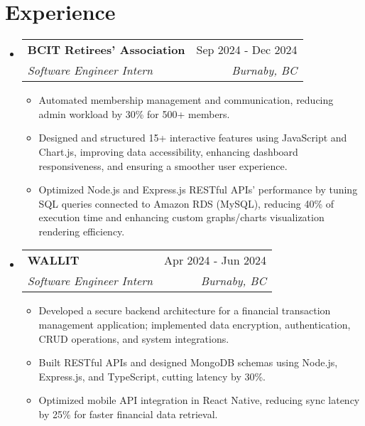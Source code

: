 \documentclass[letterpaper,11pt]{article}
\makeatletter
\newcommand{\resumeItem}[1]{
\item\small{
{#1 \vspace{-2pt}}
}
}
\newcommand{\resumeSubheading}[4]{
\vspace{-2pt}\item
\begin{tabular*}{0.97\textwidth}[t]{l@{\extracolsep{\fill}}r}
\textbf{#1} & #2 \\
\textit{\small#3} & \textit{\small #4} \\
\end{tabular*}\vspace{-7pt}
}
\newcommand{\resumeSubHeadingListStart}{\begin{itemize}[leftmargin=0.15in, label={}]}
\newcommand{\resumeSubHeadingListEnd}{\end{itemize}}
\newcommand{\resumeItemListStart}{\begin{itemize}}
\newcommand{\resumeItemListEnd}{\end{itemize}\vspace{-5pt}}
\makeatother
\begin{document}
\section{Experience}
\resumeSubHeadingListStart
\resumeSubheading{BCIT Retirees' Association}{Sep 2024 - Dec 2024}{Software Engineer Intern}{Burnaby, BC}
\resumeItemListStart
\resumeItem{Automated membership management and communication, reducing admin workload by 30\% for 500+ members.}
\resumeItem{Designed and structured 15+ interactive features using JavaScript and Chart.js, improving data accessibility, enhancing dashboard responsiveness, and ensuring a smoother user experience.}
\resumeItem{Optimized Node.js and Express.js RESTful APIs' performance by tuning SQL queries connected to Amazon RDS (MySQL), reducing 40\% of execution time and enhancing custom graphs/charts visualization rendering efficiency.}
\resumeItemListEnd
\resumeSubheading{WALLIT}{Apr 2024 - Jun 2024}{Software Engineer Intern}{Burnaby, BC}
\resumeItemListStart
\resumeItem{Developed a secure backend architecture for a financial transaction management application; implemented data encryption, authentication, CRUD operations, and system integrations.}
\resumeItem{Built RESTful APIs and designed MongoDB schemas using Node.js, Express.js, and TypeScript, cutting latency by 30\%.}
\resumeItem{Optimized mobile API integration in React Native, reducing sync latency by 25\% for faster financial data retrieval.}
\resumeItemListEnd
\resumeSubHeadingListEnd
\end{document}
